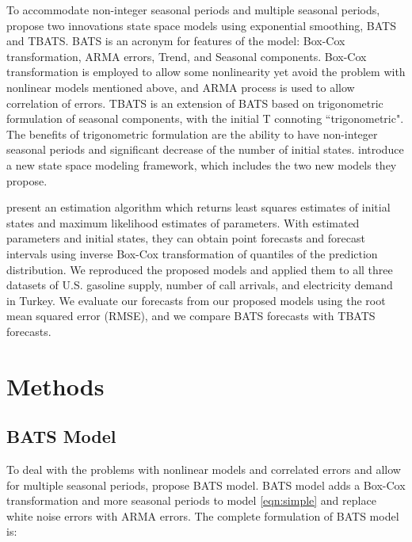 \documentclass{uwstat572}
\begin{document}
To accommodate non-integer seasonal periods and multiple seasonal periods, \citet{de2011forecasting} propose two innovations state space models using exponential smoothing, BATS and TBATS. BATS is an acronym for features of the model: Box-Cox transformation, ARMA errors, Trend, and Seasonal components. Box-Cox transformation is employed to allow some nonlinearity yet avoid the problem with nonlinear models mentioned above, and ARMA process is used to allow correlation of errors. TBATS is an extension of BATS based on trigonometric formulation of seasonal components, with the initial T connoting ``trigonometric". The benefits of trigonometric formulation are the ability to have non-integer seasonal periods and significant decrease of the number of initial states. \citet{de2011forecasting} introduce a new state space modeling framework, which includes the two new models they propose.  

\citet{de2011forecasting} present an estimation algorithm which returns least squares estimates of initial states and maximum likelihood estimates of parameters. With estimated parameters and initial states, they can obtain point forecasts and forecast intervals using inverse Box-Cox transformation of quantiles of the prediction distribution. We reproduced the proposed models and  applied them to all three datasets of U.S. gasoline supply, number of call arrivals, and electricity demand in Turkey. We evaluate our forecasts from our proposed models using the root mean squared error (RMSE), and we compare BATS forecasts with TBATS forecasts.

\section{Methods}
\subsection{BATS Model}
To deal with the problems with nonlinear models and correlated errors and allow for multiple seasonal periods, \citet{de2011forecasting} propose BATS model. BATS model adds a Box-Cox transformation and more seasonal periods to model \ref{eqn:simple} and replace white noise errors with ARMA errors. The complete formulation of BATS model is:  
\end{document}
